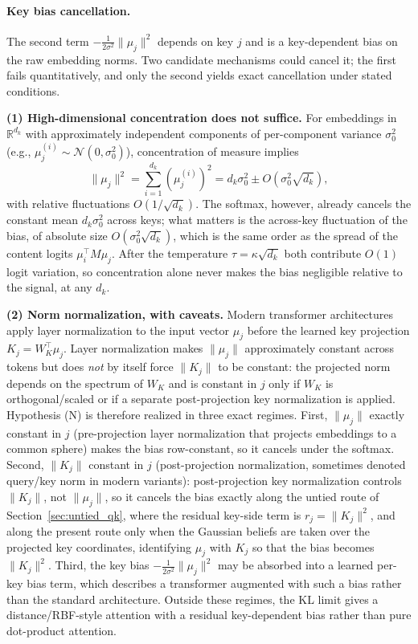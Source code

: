 \paragraph{Key bias cancellation.}
The second term $-\frac{1}{2\sigma^2}\|\mu_j\|^2$ depends on key $j$ and is a key-dependent bias on the raw embedding norms. Two candidate mechanisms could cancel it; the first fails quantitatively, and only the second yields exact cancellation under stated conditions.

\textbf{(1) High-dimensional concentration does not suffice.}
For embeddings in $\mathbb{R}^{d_k}$ with approximately independent components of per-component variance $\sigma_0^2$ (e.g., $\mu_j^{(i)} \sim \mathcal{N}(0, \sigma_0^2)$), concentration of measure implies
\begin{equation}
\|\mu_j\|^2 = \sum_{i=1}^{d_k} (\mu_j^{(i)})^2 = d_k\sigma_0^2 \pm O(\sigma_0^2\sqrt{d_k}),
\end{equation}
with relative fluctuations $O(1/\sqrt{d_k})$. The softmax, however, already cancels the constant mean $d_k\sigma_0^2$ across keys; what matters is the across-key fluctuation of the bias, of absolute size $O(\sigma_0^2\sqrt{d_k})$, which is the same order as the spread of the content logits $\mu_i^\top M\mu_j$. After the temperature $\tau = \kappa\sqrt{d_k}$ both contribute $O(1)$ logit variation, so concentration alone never makes the bias negligible relative to the signal, at any $d_k$.

\textbf{(2) Norm normalization, with caveats.}
Modern transformer architectures apply layer normalization to the input vector $\mu_j$ before the learned key projection $K_j = W_K^\top \mu_j$. Layer normalization makes $\|\mu_j\|$ approximately constant across tokens but does \emph{not} by itself force $\|K_j\|$ to be constant: the projected norm depends on the spectrum of $W_K$ and is constant in $j$ only if $W_K$ is orthogonal/scaled or if a separate post-projection key normalization is applied. Hypothesis (N) is therefore realized in three exact regimes. First, $\|\mu_j\|$ exactly constant in $j$ (pre-projection layer normalization that projects embeddings to a common sphere) makes the bias row-constant, so it cancels under the softmax. Second, $\|K_j\|$ constant in $j$ (post-projection normalization, sometimes denoted query/key norm in modern variants): post-projection key normalization controls $\|K_j\|$, not $\|\mu_j\|$, so it cancels the bias exactly along the untied route of Section~\ref{sec:untied_qk}, where the residual key-side term is $r_j = \|K_j\|^2$, and along the present route only when the Gaussian beliefs are taken over the projected key coordinates, identifying $\mu_j$ with $K_j$ so that the bias becomes $\|K_j\|^2$. Third, the key bias $-\tfrac{1}{2\sigma^2}\|\mu_j\|^2$ may be absorbed into a learned per-key bias term, which describes a transformer augmented with such a bias rather than the standard architecture. Outside these regimes, the KL limit gives a distance/RBF-style attention with a residual key-dependent bias rather than pure dot-product attention.

